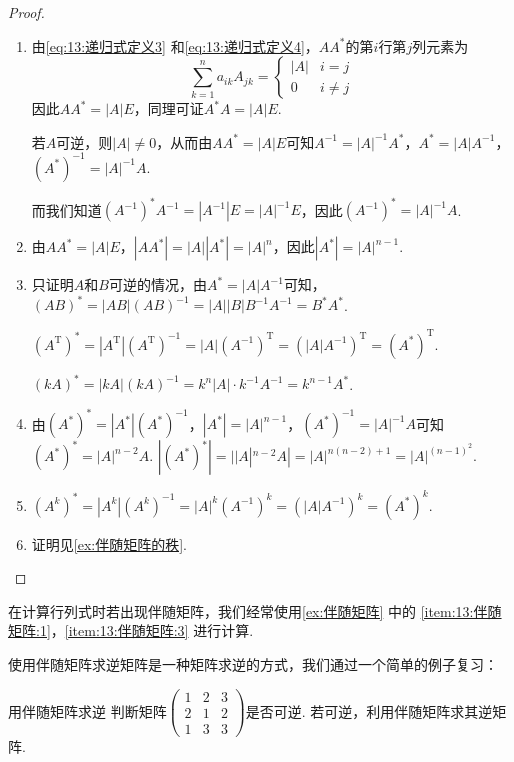 \begin{proof}
    \begin{enumerate}
        \item 由\autoref{eq:13:递归式定义3} 和\autoref{eq:13:递归式定义4}，$AA^*$的第$i$行第$j$列元素为
              \[\sum_{k=1}^{n}a_{ik}A_{jk}=\begin{cases}
                      |A| & i=j      \\
                      0   & i \neq j
                  \end{cases}\]
              因此$AA^*=|A|E$，同理可证$A^*A=|A|E$.

              若$A$可逆，则$|A| \neq 0$，从而由$AA^*=|A|E$可知$A^{-1}=|A|^{-1}A^*$，$A^*=|A|A^{-1}$，$(A^*)^{-1}=|A|^{-1}A$.

              而我们知道$(A^{-1})^*A^{-1}=|A^{-1}|E=|A|^{-1}E$，因此$(A^{-1})^*=|A|^{-1}A$.

        \item 由$AA^*=|A|E$，$|AA^*|=|A||A^*|=|A|^n$，因此$|A^*|=|A|^{n-1}$.

        \item 只证明$A$和$B$可逆的情况，由$A^*=|A|A^{-1}$可知，$(AB)^*=|AB|(AB)^{-1}=|A||B|B^{-1}A^{-1}=B^*A^*$.

              $(A^\mathrm{T})^*=|A^\mathrm{T}|(A^\mathrm{T})^{-1}=|A|(A^{-1})^\mathrm{T}=(|A|A^{-1})^\mathrm{T}=(A^*)^\mathrm{T}$.

              $(kA)^*=|kA|(kA)^{-1}=k^n|A|\cdot k^{-1}A^{-1}=k^{n-1}A^*$.

        \item 由$(A^*)^*=|A^*|(A^*)^{-1}$，$|A^*|=|A|^{n-1}$，$(A^*)^{-1}=|A|^{-1}A$可知$(A^*)^*=|A|^{n-2}A$. $|(A^*)^*|=||A|^{n-2}A|=|A|^{n(n-2)+1}=|A|^{(n-1)^2}$.

        \item $(A^k)^*=|A^k|(A^k)^{-1}=|A|^k(A^{-1})^k=(|A|A^{-1})^k=(A^*)^k$.

        \item 证明见\autoref{ex:伴随矩阵的秩}.
    \end{enumerate}
\end{proof}

在计算行列式时若出现伴随矩阵，我们经常使用\autoref{ex:伴随矩阵} 中的 \ref*{item:13:伴随矩阵:1}，\ref*{item:13:伴随矩阵:3} 进行计算.

使用伴随矩阵求逆矩阵是一种矩阵求逆的方式，我们通过一个简单的例子复习：

\begin{example}{}{用伴随矩阵求逆}
    判断矩阵$\begin{pmatrix}
            1 & 2 & 3 \\ 2 & 1 & 2 \\ 1 & 3 & 3
        \end{pmatrix}$是否可逆. 若可逆，利用伴随矩阵求其逆矩阵.
\end{example}

